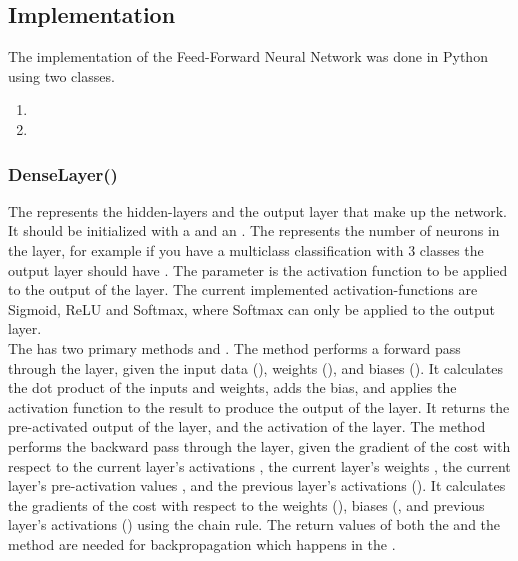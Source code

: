 \subsection{Implementation}
The implementation of the Feed-Forward Neural Network was done in Python using two classes. \\
\begin{enumerate}
    \item {}
    \item {}
    \end{enumerate}
\vspace{10pt}

\subsubsection{DenseLayer()}
The  represents the hidden-layers and the output layer that make up the network.
It should be initialized with a  and an .
The  represents the number of neurons in the layer, for example
if you have a multiclass classification with 3 classes the output layer should have .
The  parameter is the activation function to be applied to the output of the layer.
The current implemented activation-functions are Sigmoid, ReLU and Softmax, where Softmax can only be applied to the output layer.\\

The  has two primary methods  and .
The  method performs a forward pass through the layer, given the input data (), weights (), and biases ().
It calculates the dot product of the inputs and weights, adds the bias, and applies the activation function to the result to produce the output of the layer.
It returns the pre-activated output of the layer, and the activation of the layer.
The  method performs the backward pass through the layer, given the gradient of the cost with respect to the current layer's activations , the current layer's weights , the current layer's pre-activation values , and the previous layer's activations ().
It calculates the gradients of the cost with respect to the weights (), biases (, and previous layer's activations () using the chain rule.
The return values of both the  and the  method are needed for backpropagation which happens in the . \cite{towardsdatascience}


